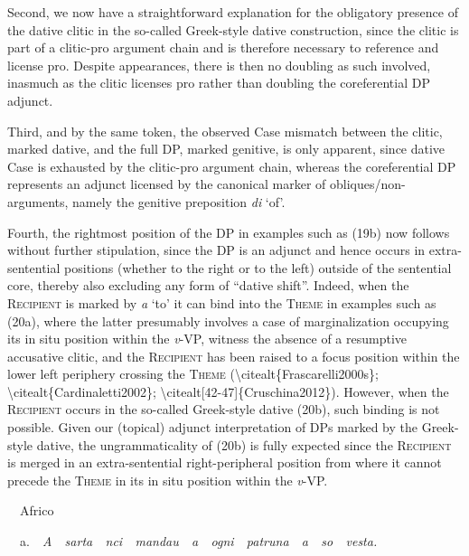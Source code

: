 \documentclass[output=paper,modfonts,nonflat]{langsci/langscibook}
\begin{document}
\begin{styleStandard}
Second, we now have a straightforward explanation for the obligatory presence of the dative clitic in the so-called Greek-style dative construction, since the clitic is part of a clitic-pro argument chain and is therefore necessary to reference and license pro. Despite appearances, there is then no doubling as such involved, inasmuch as the clitic licenses pro rather than doubling the coreferential DP adjunct. 
\end{styleStandard}

\begin{styleStandard}
Third, and by the same token, the observed Case mismatch between the clitic, marked dative, and the full DP, marked genitive, is only apparent, since dative Case is exhausted by the clitic-pro argument chain, whereas the coreferential DP represents an adjunct licensed by the canonical marker of obliques/non-arguments, namely the genitive preposition \textit{di }‘of’. 
\end{styleStandard}

\begin{styleStandard}
Fourth, the rightmost position of the DP in examples such as (19b) now follows without further stipulation, since the DP is an adjunct and hence occurs in extra-sentential positions (whether to the right or to the left) outside of the sentential core, thereby also excluding any form of “dative shift”. Indeed, when the \textsc{Recipient} is marked by \textit{a }‘to’ it can bind into the \textsc{Theme} in examples such as (20a), where the latter presumably involves a case of marginalization occupying its in situ position within the \textit{v}{}-VP, witness the absence of a resumptive accusative clitic, and the \textsc{Recipient} has been raised to a focus position within the lower left periphery crossing the \textsc{Theme} ({\textbackslash}citealt\{Frascarelli2000s\}; {\textbackslash}citealt\{Cardinaletti2002\}; {\textbackslash}citealt[42-47]\{Cruschina2012\}). However, when the \textsc{Recipient} occurs in the so-called Greek-style dative (20b), such binding is not possible. Given our (topical) adjunct interpretation of DPs marked by the Greek-style dative, the ungrammaticality of (20b) is fully expected since the \textsc{Recipient} is merged in an extra-sentential right-peripheral position from where it cannot precede the \textsc{Theme} in its in situ position within the \textit{v}{}-VP.
\end{styleStandard}

\begin{listWWNumviiileveli}
\item 
\begin{styleListParagraph}
\ \ Africo
\end{styleListParagraph}
\end{listWWNumviiileveli}
\begin{styleStandard}
\ \ a.\ \ \textit{A\ \ sarta\ \ nci\ \ mandau\ \ a\ \ ogni\ \ patruna\ \ a\ \ so\ \ vesta.}
\end{styleStandard}
\end{document}
